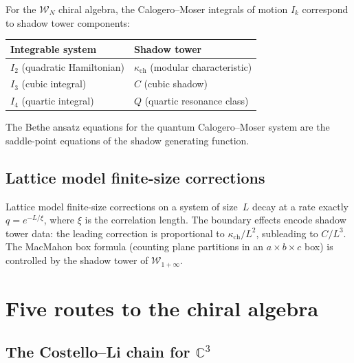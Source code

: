 \documentclass[11pt]{article}
\newcommand{\cW}{\mathcal{W}}
\newcommand{\C}{\mathbb{C}}
\begin{document}
\begin{proposition}
\label{prop:calogero-bethe}
For the $\cW_N$ chiral algebra, the Calogero--Moser integrals of motion $I_k$ correspond to shadow tower components:
\begin{center}
\renewcommand{\arraystretch}{1.2}
\begin{tabular}{ll}
 \toprule
 \textbf{Integrable system} & \textbf{Shadow tower} \\
 \midrule
 $I_2$ (quadratic Hamiltonian) & $\kappa_{\mathrm{ch}}$ (modular characteristic) \\
 $I_3$ (cubic integral) & $C$ (cubic shadow) \\
 $I_4$ (quartic integral) & $Q$ (quartic resonance class) \\
 \bottomrule
\end{tabular}
\end{center}
The Bethe ansatz equations for the quantum Calogero--Moser system are the saddle-point equations of the shadow generating function.
\end{proposition}

\subsection{Lattice model finite-size corrections}
\label{subsec:lattice-fsc}

\begin{proposition}
\label{prop:lattice-fsc}
Lattice model finite-size corrections on a system of size~$L$ decay at a rate exactly $q = e^{-L/\xi}$, where $\xi$ is the correlation length. The boundary effects encode shadow tower data: the leading correction is proportional to $\kappa_{\mathrm{ch}}/L^2$, subleading to $C/L^3$. The MacMahon box formula (counting plane partitions in an $a \times b \times c$ box) is controlled by the shadow tower of $\cW_{1+\infty}$.
\end{proposition}


\section{Five routes to the chiral algebra}
\label{sec:five-routes}

\subsection{The Costello--Li chain for $\C^3$}
\label{subsec:costello-li-c3}
\end{document}
